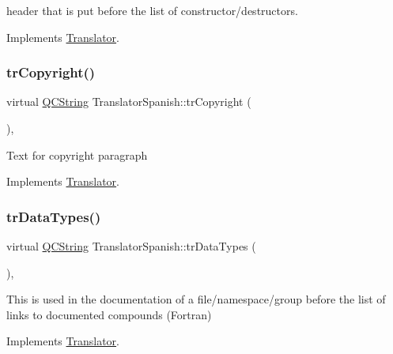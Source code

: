 header that is put before the list of constructor/destructors. 

Implements \mbox{\hyperlink{class_translator}{Translator}}.

\mbox{\label{class_translator_spanish_a9025d8c86e60a0deeb3754b81da9278d}} 
\subsubsection{\texorpdfstring{trCopyright()}{trCopyright()}}
{\footnotesize\ttfamily virtual \mbox{\hyperlink{class_q_c_string}{Q\+C\+String}} Translator\+Spanish\+::tr\+Copyright (\begin{DoxyParamCaption}{ }\end{DoxyParamCaption})\hspace{0.3cm}{\ttfamily [inline]}, {\ttfamily [virtual]}}

Text for copyright paragraph 

Implements \mbox{\hyperlink{class_translator}{Translator}}.

\mbox{\label{class_translator_spanish_a2ff99a9085234b004300c83f860ce0fe}} 
\subsubsection{\texorpdfstring{trDataTypes()}{trDataTypes()}}
{\footnotesize\ttfamily virtual \mbox{\hyperlink{class_q_c_string}{Q\+C\+String}} Translator\+Spanish\+::tr\+Data\+Types (\begin{DoxyParamCaption}{ }\end{DoxyParamCaption})\hspace{0.3cm}{\ttfamily [inline]}, {\ttfamily [virtual]}}

This is used in the documentation of a file/namespace/group before the list of links to documented compounds (Fortran) 

Implements \mbox{\hyperlink{class_translator}{Translator}}.

\mbox{\label{class_translator_spanish_ada7f90d1cdd855da265e39031752241b}} 
